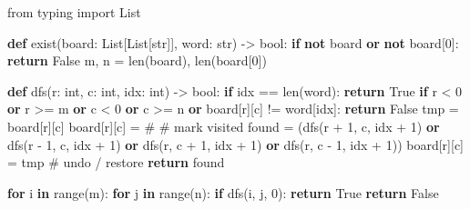 \documentclass[11pt]{article}
\newenvironment{Shaded}{\begin{snugshade}}{\end{snugshade}}
\newcommand{\BuiltInTok}[1]{\textcolor[rgb]{0.50,0.55,0.55}{#1}}
\newcommand{\CommentTok}[1]{\textcolor[rgb]{0.48,0.49,0.49}{#1}}
\newcommand{\ControlFlowTok}[1]{\textcolor[rgb]{0.99,0.74,0.29}{\textbf{#1}}}
\newcommand{\DecValTok}[1]{\textcolor[rgb]{0.96,0.45,0.00}{#1}}
\newcommand{\ImportTok}[1]{\textcolor[rgb]{0.15,0.68,0.38}{#1}}
\newcommand{\KeywordTok}[1]{\textcolor[rgb]{0.81,0.81,0.76}{\textbf{#1}}}
\newcommand{\NormalTok}[1]{\textcolor[rgb]{0.81,0.81,0.76}{#1}}
\newcommand{\OperatorTok}[1]{\textcolor[rgb]{0.81,0.81,0.76}{#1}}
\newcommand{\StringTok}[1]{\textcolor[rgb]{0.96,0.31,0.31}{#1}}
\newcommand{\VariableTok}[1]{\textcolor[rgb]{0.15,0.68,0.68}{#1}}
\begin{document}
\begin{Shaded}
\begin{Highlighting}[]
\ImportTok{from}\NormalTok{ typing }\ImportTok{import}\NormalTok{ List}

\KeywordTok{def}\NormalTok{ exist(board: List[List[}\BuiltInTok{str}\NormalTok{]], word: }\BuiltInTok{str}\NormalTok{) }\OperatorTok{{-}\textgreater{}} \BuiltInTok{bool}\NormalTok{:}
    \ControlFlowTok{if} \KeywordTok{not}\NormalTok{ board }\KeywordTok{or} \KeywordTok{not}\NormalTok{ board[}\DecValTok{0}\NormalTok{]:}
        \ControlFlowTok{return} \VariableTok{False}
\NormalTok{    m, n }\OperatorTok{=} \BuiltInTok{len}\NormalTok{(board), }\BuiltInTok{len}\NormalTok{(board[}\DecValTok{0}\NormalTok{])}

    \KeywordTok{def}\NormalTok{ dfs(r: }\BuiltInTok{int}\NormalTok{, c: }\BuiltInTok{int}\NormalTok{, idx: }\BuiltInTok{int}\NormalTok{) }\OperatorTok{{-}\textgreater{}} \BuiltInTok{bool}\NormalTok{:}
        \ControlFlowTok{if}\NormalTok{ idx }\OperatorTok{==} \BuiltInTok{len}\NormalTok{(word):}
            \ControlFlowTok{return} \VariableTok{True}
        \ControlFlowTok{if}\NormalTok{ r }\OperatorTok{\textless{}} \DecValTok{0} \KeywordTok{or}\NormalTok{ r }\OperatorTok{\textgreater{}=}\NormalTok{ m }\KeywordTok{or}\NormalTok{ c }\OperatorTok{\textless{}} \DecValTok{0} \KeywordTok{or}\NormalTok{ c }\OperatorTok{\textgreater{}=}\NormalTok{ n }\KeywordTok{or}\NormalTok{ board[r][c] }\OperatorTok{!=}\NormalTok{ word[idx]:}
            \ControlFlowTok{return} \VariableTok{False}
\NormalTok{        tmp }\OperatorTok{=}\NormalTok{ board[r][c]}
\NormalTok{        board[r][c] }\OperatorTok{=} \StringTok{\textquotesingle{}\#\textquotesingle{}}                    \CommentTok{\# mark visited}
\NormalTok{        found }\OperatorTok{=}\NormalTok{ (dfs(r }\OperatorTok{+} \DecValTok{1}\NormalTok{, c, idx }\OperatorTok{+} \DecValTok{1}\NormalTok{) }\KeywordTok{or}
\NormalTok{                 dfs(r }\OperatorTok{{-}} \DecValTok{1}\NormalTok{, c, idx }\OperatorTok{+} \DecValTok{1}\NormalTok{) }\KeywordTok{or}
\NormalTok{                 dfs(r, c }\OperatorTok{+} \DecValTok{1}\NormalTok{, idx }\OperatorTok{+} \DecValTok{1}\NormalTok{) }\KeywordTok{or}
\NormalTok{                 dfs(r, c }\OperatorTok{{-}} \DecValTok{1}\NormalTok{, idx }\OperatorTok{+} \DecValTok{1}\NormalTok{))}
\NormalTok{        board[r][c] }\OperatorTok{=}\NormalTok{ tmp                     }\CommentTok{\# undo / restore}
        \ControlFlowTok{return}\NormalTok{ found}

    \ControlFlowTok{for}\NormalTok{ i }\KeywordTok{in} \BuiltInTok{range}\NormalTok{(m):}
        \ControlFlowTok{for}\NormalTok{ j }\KeywordTok{in} \BuiltInTok{range}\NormalTok{(n):}
            \ControlFlowTok{if}\NormalTok{ dfs(i, j, }\DecValTok{0}\NormalTok{):}
                \ControlFlowTok{return} \VariableTok{True}
    \ControlFlowTok{return} \VariableTok{False}
\end{Highlighting}
\end{Shaded}
\end{document}
